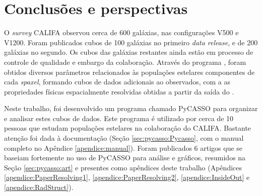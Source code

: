 



\chapter{Conclusões e perspectivas}
\label{sec:conclusao}

O {\em survey} CALIFA observou cerca de 600 galáxias, nas configurações V500 e
V1200. Foram publicados cubos de 100 galáxias no primeiro {\em data release}, e
de 200 galáxias no segundo. Os cubos das galáxias restantes ainda estão em
processo de controle de qualidade e embargo da colaboração. Através do programa
\starlight, foram obtidos diversos parâmetros relacionados às populações
estelares componentes de cada {\em spaxel}, formando cubos de dados adicionais
ao observados, com a as propriedades físicas espacialmente resolvidas obtidas a
partir da saída do \starlight.

Neste trabalho, foi desenvolvido um programa chamado PyCASSO para organizar e
analisar estes cubos de dados. Este programa é utilizado por cerca de 10 pessoas
que estudam populações estelares na colaboração do CALIFA. Bastante atenção foi
dada à documentação (Seção \ref{sec:pycasso:Pycasso}, com o manual completo no
Apêndice \ref{apendice:manual}). Foram publicados 6 artigos que se baseiam
fortemente no uso de PyCASSO para análise e gráficos, resumidos na Seção
\ref{sec:pycasso:art} e presentes como apêndices deste trabalho (Apêndices
\ref{apendice:PaperResolving1}, \ref{apendice:PaperResolving2},
\ref{apendice:InsideOut} e \ref{apendice:RadStruct}).

